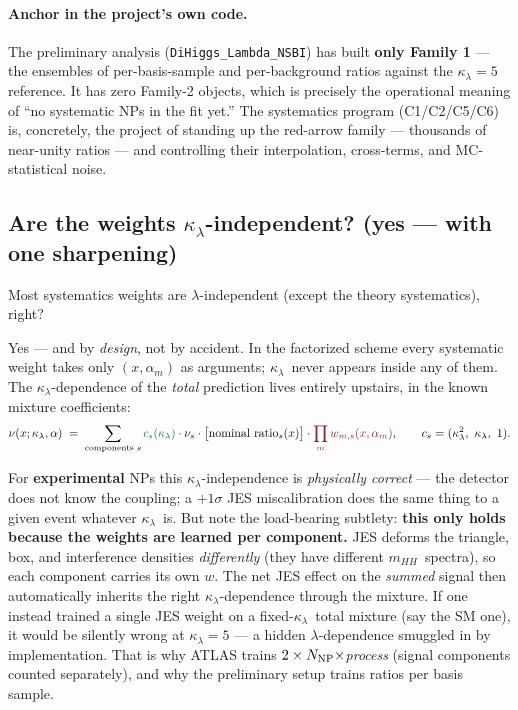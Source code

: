 \documentclass[11pt]{article}
\newcommand{\kl}{\ensuremath{\kappa_\lambda}}
\newcommand{\mhh}{\ensuremath{m_{HH}}}
\begin{document}
\paragraph{Anchor in the project's own code.} The preliminary analysis (\texttt{DiHiggs\_Lambda\_NSBI}) has
built \textbf{only Family 1} --- the ensembles of per-basis-sample and per-background ratios against the
$\kl{=}5$ reference. It has zero Family-2 objects, which is precisely the operational meaning of ``no
systematic NPs in the fit yet.'' The systematics program (C1/C2/C5/C6) is, concretely, the project of standing
up the red-arrow family --- thousands of near-unity ratios --- and controlling their interpolation, cross-terms,
and MC-statistical noise.

\subsection{Are the weights \kl-independent? (yes --- with one sharpening)}\label{sec:lambdaindep}

\begin{qbox}[Question]
Most systematics weights are $\lambda$-independent (except the theory systematics), right?
\end{qbox}

Yes --- and by \emph{design}, not by accident. In the factorized scheme every systematic weight takes only
$(x,\alpha_m)$ as arguments; \kl\ never appears inside any of them. The \kl-dependence of the \emph{total}
prediction lives entirely upstairs, in the known mixture coefficients:
\begin{equation}
\nu(x;\kl,\alpha)\;=\;\sum_{\text{components }s}{\color{known}c_s(\kl)}\cdot\nu_s\cdot
\big[\text{nominal ratio}_s(x)\big]\cdot{\color{accent}\prod_m w_{m,s}(x,\alpha_m)},\qquad
c_s=(\kl^2,\ \kl,\ 1).
\end{equation}

For \textbf{experimental} NPs this \kl-independence is \emph{physically correct} --- the detector does not know
the coupling; a $+1\sigma$ JES miscalibration does the same thing to a given event whatever \kl\ is. But note
the load-bearing subtlety: \textbf{this only holds because the weights are learned per component.} JES deforms
the triangle, box, and interference densities \emph{differently} (they have different \mhh\ spectra), so each
component carries its own $w$. The net JES effect on the \emph{summed} signal then automatically inherits the
right \kl-dependence through the mixture. If one instead trained a single JES weight on a fixed-\kl\ total
mixture (say the SM one), it would be silently wrong at $\kl=5$ --- a hidden $\lambda$-dependence smuggled in by
implementation. That is why ATLAS trains $2\times N_{\rm NP}\times$\emph{process} (signal components counted
separately), and why the preliminary setup trains ratios per basis sample.
\end{document}
